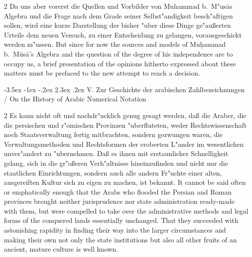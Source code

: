\documentclass[10pt,a4paper]{article}
\makeatletter
\renewcommand{\switchcolumn}{\syncronize\nointerlineskip\columnbreak}
\renewcommand{\section}{\@startsection{section}{1}{\z@}%
  {-3.5ex \@plus -1ex \@minus -.2ex}%
  {2.3ex \@plus .2ex}%
  {\normalfont\Large\bfseries\color{sectioncolor}}}
\makeatother
\begin{document}
\begin{paracol}{2}
Da uns aber vorerst die Quellen und Vorbilder von Muhammad b.\ M"us\=as Algebra und die Frage nach dem Grade seiner Selbst"andigkeit besch"aftigen sollen, wird eine kurze Darstellung der bisher "uber diese Dinge ge"au\ss{}erten Urteile dem neuen Versuch, zu einer Entscheidung zu gelangen, vorausgeschickt werden m"ussen.
\switchcolumn
But since for now the sources and models of Mu\d{h}ammad b.\ M\=us\=a's Algebra and the question of the degree of his independence are to occupy us, a brief presentation of the opinions hitherto expressed about these matters must be prefaced to the new attempt to reach a decision.
\end{paracol}
\clearpage

\section{V. Zur Geschichte der arabischen Zahlbezeichnungen / On the History of Arabic Numerical Notation}

\begin{paracol}{2}
Es kann nicht oft und nachdr"ucklich genug gesagt werden, da\ss{} die Araber, die die persischen und r"omischen Provinzen "uberfluteten, weder Rechtswissenschaft noch Staatsverwaltung fertig mitbrachten, sondern gezwungen waren, die Verwaltungsmethoden und Rechtsformen der eroberten L"ander im wesentlichen unver"andert zu "ubernehmen. Da\ss{} es ihnen mit erstaunlicher Schnelligkeit gelang, sich in die gr"o\ss{}eren Verh"altnisse hineinzufinden und nicht nur die staatlichen Einrichtungen, sondern auch alle andern Fr"uchte einer alten, ausgereiften Kultur sich zu eigen zu machen, ist bekannt.
\switchcolumn
It cannot be said often or emphatically enough that the Arabs who flooded the Persian and Roman provinces brought neither jurisprudence nor state administration ready-made with them, but were compelled to take over the administrative methods and legal forms of the conquered lands essentially unchanged. That they succeeded with astonishing rapidity in finding their way into the larger circumstances and making their own not only the state institutions but also all other fruits of an ancient, mature culture is well known.
\end{paracol}
\end{document}
